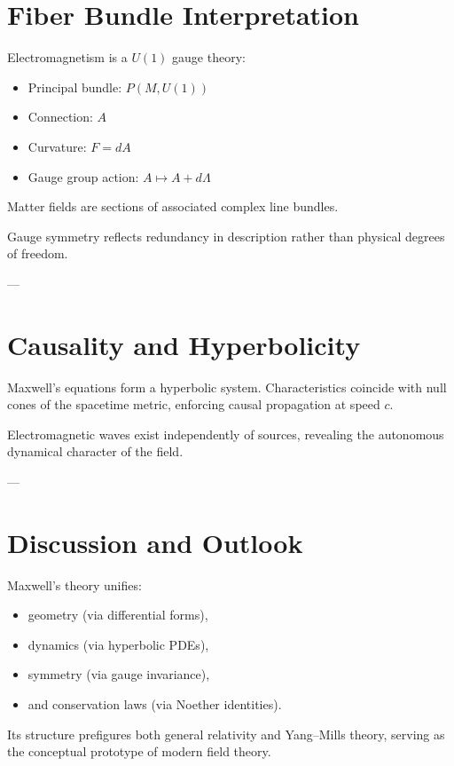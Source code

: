 \documentclass[12pt]{article}
\begin{document}
\section{Fiber Bundle Interpretation}

Electromagnetism is a $U(1)$ gauge theory:

\begin{itemize}
\item Principal bundle: $P(M,U(1))$
\item Connection: $A$
\item Curvature: $F = dA$
\item Gauge group action: $A \mapsto A + d\Lambda$
\end{itemize}

Matter fields are sections of associated complex line bundles.

Gauge symmetry reflects redundancy in description rather than physical degrees of freedom.

---

\section{Causality and Hyperbolicity}

Maxwell’s equations form a hyperbolic system. Characteristics coincide with null cones of the spacetime metric, enforcing causal propagation at speed $c$.

Electromagnetic waves exist independently of sources, revealing the autonomous dynamical character of the field.

---

\section{Discussion and Outlook}

Maxwell’s theory unifies:
\begin{itemize}
\item geometry (via differential forms),
\item dynamics (via hyperbolic PDEs),
\item symmetry (via gauge invariance),
\item and conservation laws (via Noether identities).
\end{itemize}

Its structure prefigures both general relativity and Yang–Mills theory, serving as the conceptual prototype of modern field theory.
\end{document}
